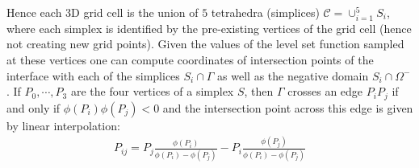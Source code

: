 \documentclass{elsarticle}
\begin{document}
Hence each 3D grid cell is the union of $5$ tetrahedra (simplices) $\mathcal{C}=\cup_{i=1}^5 S_i$, where each simplex is identified by the pre-existing vertices of the grid cell (hence not creating new grid points). Given the values of the level set function sampled at these vertices one can compute coordinates of intersection points of the interface with each of the simplices $S_i \cap \Gamma $ as well as the negative domain $S_i \cap \Omega^-$. If ${P_0,\cdots, P_3}$ are the four vertices of a simplex $S$, then $\Gamma$ crosses an edge $P_i P_j$ if and only if $\phi(P_i)\phi(P_j)<0$ and the intersection point across this edge is given by linear interpolation:
\begin{align*}
P_{ij}=P_j \frac{\phi(P_i)}{\phi(P_i) - \phi(P_j)} - P_i \frac{\phi(P_j)}{\phi(P_i) - \phi(P_j)}
\end{align*}
\end{document}
